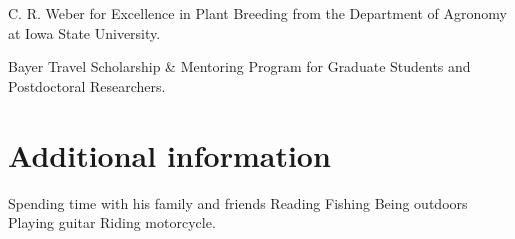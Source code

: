 \documentclass[]{mdkrause_cv_openfont}
\begin{document}
\begin{minipage}[t]{1\textwidth}
\begin{tightemize}
	\item {} C. R. Weber for Excellence in Plant Breeding from the Department of Agronomy at Iowa State University.
	\item {} Bayer Travel Scholarship \& Mentoring Program for Graduate Students and Postdoctoral Researchers.
\end{tightemize}

\vspace{3 mm}

\section{Additional information}

\sectionsep

Spending time with his family and friends \textbullet{} Reading \textbullet{} Fishing \textbullet{} Being outdoors \textbullet{} Playing guitar \textbullet{} Riding motorcycle. \\

\sectionsep
{}

\sectionsep



\end{minipage}
\end{document}
